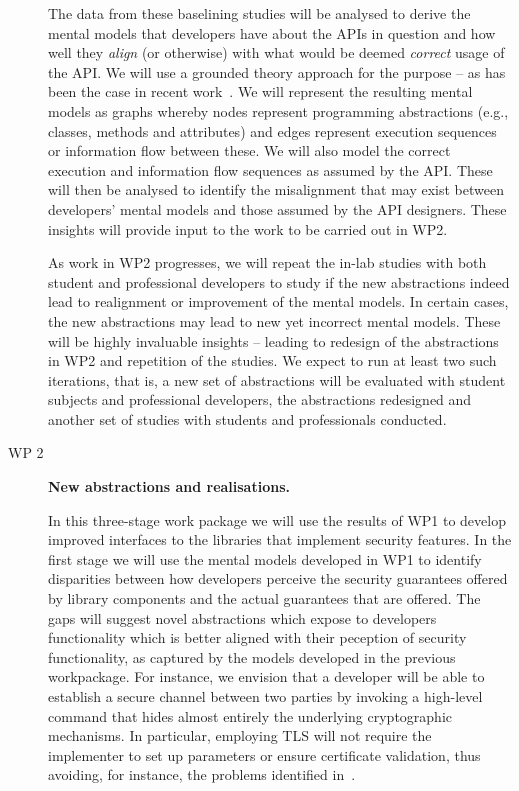 \documentclass[10pt]{article}
\begin{document}
\begin{description}
The data from these baselining studies will be analysed to derive the mental models that developers have about the APIs in question and how well they \emph{align} (or otherwise) with what would be deemed \emph{correct} usage of the API. We will use a grounded theory approach for the purpose -- as has been the case in recent work~\cite{ramokapane2017}. We will represent the resulting mental models as graphs whereby nodes represent programming abstractions (e.g., classes, methods and attributes) and edges represent execution sequences or information flow between these. We will also model the correct execution and information flow sequences as assumed by the API. These will then be analysed to identify the misalignment that may exist between developers' mental models and those assumed by the API designers. These insights will provide input to the work to be carried out in WP2.

As work in WP2 progresses, we will repeat the in-lab studies with both student and professional developers to study if the new abstractions indeed lead to realignment or improvement of the mental models. In certain cases, the new abstractions may lead to new yet incorrect mental models. These will be highly invaluable insights -- leading to redesign of the abstractions in WP2 and repetition of the studies. We expect to run at least two such iterations, that is, a new set of abstractions will be evaluated with student subjects and professional developers, the abstractions redesigned and another set of studies with students and professionals conducted.

\vspace{.3cm}

\item[WP 2] \textbf{New abstractions and realisations.} 

In this three-stage work package we will use the results of WP1 to develop improved interfaces to the libraries that implement security features.  
In the first stage we will use the mental models developed in WP1 to identify disparities between how developers perceive the security guarantees offered by library components and the actual guarantees that are offered. The gaps will suggest novel abstractions which expose to developers functionality which is better aligned with their peception of security functionality, as captured by the models developed in the previous workpackage. 
For instance, we envision that a developer will be able to establish a secure channel between two parties by invoking a high-level command that hides almost entirely the underlying cryptographic mechanisms.   In particular, employing TLS will not require the implementer to set up parameters or ensure certificate validation, thus avoiding, for instance, the problems identified in~\cite{GIJABS12}. 


\end{description}
\end{document}
